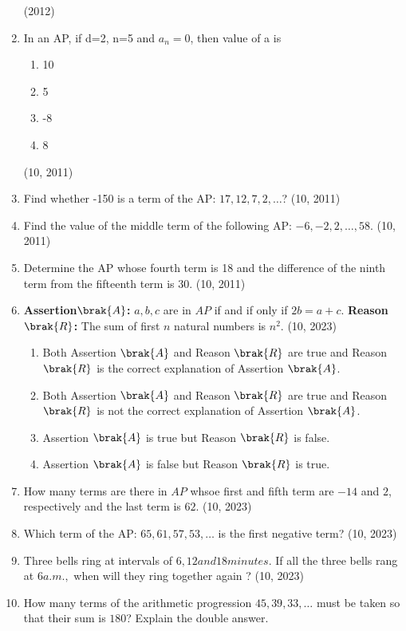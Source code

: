 \begin{enumerate}[label=\thesubsection.\arabic*,ref=\thesubsection.\theenumi,itemsep=1pt]
\hfill(2012)
\item In an AP, if d=2, n=5 and $a_n=0$, then value of a is
    \begin{multicols}{4}
\begin{enumerate}
%
\item 10
%
\item 5
%
\item -8
%
\item 8
    \end{enumerate}
\end{multicols}
    \hfill (10, 2011)
\item Find whether -150 is a term of the AP: $17, 12, 7, 2,\dots$?
    \hfill (10, 2011)
\item Find the value of the middle term of the following AP: $- 6, -2, 2,\dots, 58.$
   \hfill (10, 2011)
\item Determine the AP whose fourth term is 18 and the difference of the ninth term from the fifteenth term is 30.
    \hfill (10, 2011)
\item
\textbf{Assertion$\brak{A}$:} $a,b,c$ are in $AP$ if and if only if $2b = a + c$.
%
\textbf{Reason$\brak{R}$:} The sum of first $n$ natural numbers is $n^2$.
\hfill (10, 2023)
\begin{enumerate}
\item Both Assertion $\brak{A}$ and Reason $\brak{R}$ are true and Reason $\brak{R}$ is the correct explanation of Assertion $\brak{A}$.
\item Both Assertion $\brak{A}$ and Reason $\brak{R}$ are true and Reason $\brak{R}$ is not the correct explanation of Assertion $\brak{A}$.
\item Assertion $\brak{A}$ is true but Reason $\brak{R}$ is false.
\item Assertion $\brak{A}$ is false but Reason $\brak{R}$ is true.
\end{enumerate}
\item
How many terms are there in $AP$ whsoe first and fifth term are $-14$ and $2$, respectively and the last term is $62$.
\hfill (10, 2023)
\item
Which term of the AP: $65,61,57,53, \dots$ is the first negative term?
\hfill (10, 2023)
\item Three bells ring at intervals of $ 6, 12 and 18 minutes$. If all the three bells rang at $ 6 a.m.,$ when will they ring together again ?
\hfill (10, 2023)
\item How many terms of the arithmetic progression $45,39,33,\dots$ must be taken so that their sum is $180$? Explain the double answer.

\end{enumerate}
